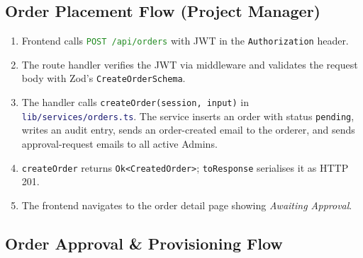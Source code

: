 \documentclass[12pt,a4paper,twoside]{report}
\newcommand{\code}[1]{\texttt{#1}}
\newcommand{\file}[1]{\texttt{\textcolor{MidnightBlue}{#1}}}
\newcommand{\route}[1]{\texttt{\textcolor{ForestGreen}{#1}}}
\begin{document}
\subsection{Order Placement Flow (Project Manager)}

\begin{enumerate}
  \item Frontend calls \route{POST /api/orders} with JWT in
        the \code{Authorization} header.
  \item The route handler verifies the JWT via middleware and validates
        the request body with Zod's \code{CreateOrderSchema}.
  \item The handler calls \code{createOrder(session, input)} in
        \file{lib/services/orders.ts}. The service inserts an order with
        status \code{pending}, writes an audit entry, sends an order-created
        email to the orderer, and sends approval-request emails to all
        active Admins.
  \item \code{createOrder} returns \code{Ok<CreatedOrder>}; \code{toResponse}
        serialises it as HTTP 201.
  \item The frontend navigates to the order detail page showing
        \textit{Awaiting Approval}.
\end{enumerate}

\subsection{Order Approval \& Provisioning Flow}
\end{document}
